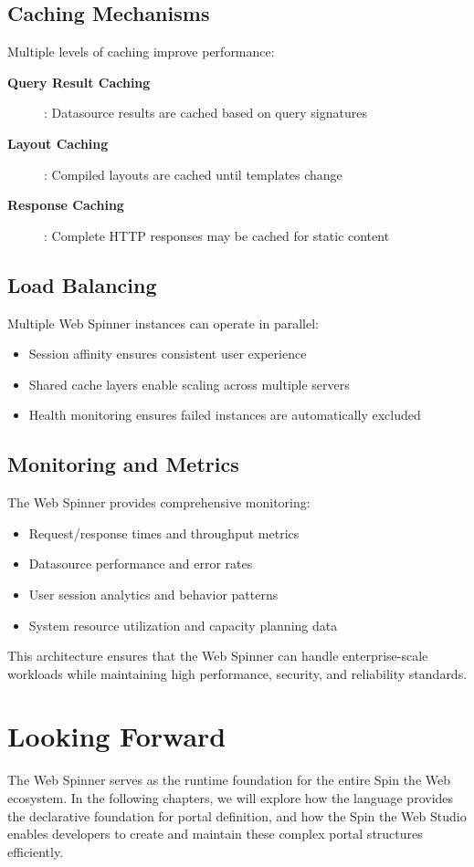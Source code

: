 \subsection{Caching Mechanisms}

Multiple levels of caching improve performance:

\begin{description}
	\item[\textbf{Query Result Caching}]: Datasource results are cached based on query signatures
	\item[\textbf{Layout Caching}]: Compiled layouts are cached until templates change
	\item[\textbf{Response Caching}]: Complete HTTP responses may be cached for static content
\end{description}

\subsection{Load Balancing}

Multiple Web Spinner instances can operate in parallel:
\begin{itemize}
	\item Session affinity ensures consistent user experience
	\item Shared cache layers enable scaling across multiple servers
	\item Health monitoring ensures failed instances are automatically excluded
\end{itemize}

\subsection{Monitoring and Metrics}

The Web Spinner provides comprehensive monitoring:
\begin{itemize}
	\item Request/response times and throughput metrics
	\item Datasource performance and error rates
	\item User session analytics and behavior patterns
	\item System resource utilization and capacity planning data
\end{itemize}

This architecture ensures that the Web Spinner can handle enterprise-scale workloads while maintaining high performance, security, and reliability standards.

\section{Looking Forward}
\label{sec:webspinner-forward}

The Web Spinner serves as the runtime foundation for the entire Spin the Web ecosystem. In the following chapters, we will explore how the \wbdl{} language provides the declarative foundation for portal definition, and how the Spin the Web Studio enables developers to create and maintain these complex portal structures efficiently.
